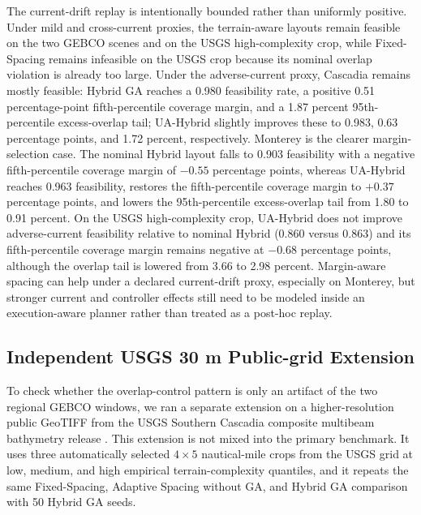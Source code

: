 \documentclass[jmse,article,submit,moreauthors]{Definitions/mdpi}
\begin{document}
The current-drift replay is intentionally bounded rather than uniformly positive. Under mild and cross-current proxies, the terrain-aware layouts remain feasible on the two GEBCO scenes and on the USGS high-complexity crop, while Fixed-Spacing remains infeasible on the USGS crop because its nominal overlap violation is already too large. Under the adverse-current proxy, Cascadia remains mostly feasible: Hybrid GA reaches a 0.980 feasibility rate, a positive 0.51 percentage-point fifth-percentile coverage margin, and a 1.87 percent 95th-percentile excess-overlap tail; UA-Hybrid slightly improves these to 0.983, 0.63 percentage points, and 1.72 percent, respectively. Monterey is the clearer margin-selection case. The nominal Hybrid layout falls to 0.903 feasibility with a negative fifth-percentile coverage margin of \(-0.55\) percentage points, whereas UA-Hybrid reaches 0.963 feasibility, restores the fifth-percentile coverage margin to \(+0.37\) percentage points, and lowers the 95th-percentile excess-overlap tail from 1.80 to 0.91 percent. On the USGS high-complexity crop, UA-Hybrid does not improve adverse-current feasibility relative to nominal Hybrid (0.860 versus 0.863) and its fifth-percentile coverage margin remains negative at \(-0.68\) percentage points, although the overlap tail is lowered from 3.66 to 2.98 percent. Margin-aware spacing can help under a declared current-drift proxy, especially on Monterey, but stronger current and controller effects still need to be modeled inside an execution-aware planner rather than treated as a post-hoc replay.

\subsection{Independent USGS 30 m Public-grid Extension}
To check whether the overlap-control pattern is only an artifact of the two regional GEBCO windows, we ran a separate extension on a higher-resolution public GeoTIFF from the USGS Southern Cascadia composite multibeam bathymetry release \cite{dartnell2026southerncascadia}. This extension is not mixed into the primary benchmark. It uses three automatically selected \(4 \times 5\) nautical-mile crops from the USGS grid at low, medium, and high empirical terrain-complexity quantiles, and it repeats the same Fixed-Spacing, Adaptive Spacing without GA, and Hybrid GA comparison with 50 Hybrid GA seeds.
\end{document}
